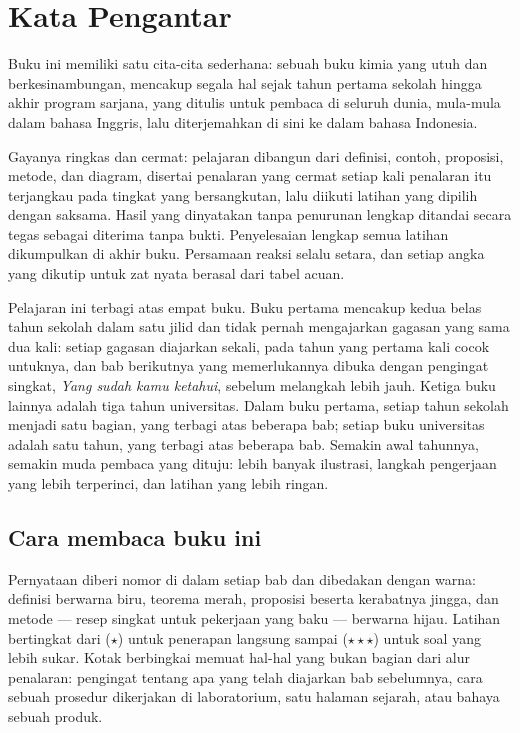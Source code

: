 \chapter{Kata Pengantar}

Buku ini memiliki satu cita-cita sederhana: sebuah buku kimia yang utuh
dan berkesinambungan, mencakup segala hal sejak tahun pertama sekolah
hingga akhir program sarjana, yang ditulis untuk pembaca di seluruh
dunia, mula-mula dalam bahasa Inggris, lalu diterjemahkan di sini ke
dalam bahasa Indonesia.

Gayanya ringkas dan cermat: pelajaran dibangun dari definisi, contoh,
proposisi, metode, dan diagram, disertai penalaran yang cermat setiap
kali penalaran itu terjangkau pada tingkat yang bersangkutan, lalu
diikuti latihan yang dipilih dengan saksama. Hasil yang dinyatakan tanpa
penurunan lengkap ditandai secara tegas sebagai diterima tanpa bukti.
Penyelesaian lengkap semua latihan dikumpulkan di akhir buku. Persamaan
reaksi selalu setara, dan setiap angka yang dikutip untuk zat nyata
berasal dari tabel acuan.

Pelajaran ini terbagi atas empat buku. Buku pertama mencakup kedua belas
tahun sekolah dalam satu jilid dan tidak pernah mengajarkan gagasan yang
sama dua kali: setiap gagasan diajarkan sekali, pada tahun yang pertama
kali cocok untuknya, dan bab berikutnya yang memerlukannya dibuka dengan
pengingat singkat, \emph{Yang sudah kamu ketahui}, sebelum melangkah
lebih jauh. Ketiga buku lainnya adalah tiga tahun universitas. Dalam
buku pertama, setiap tahun sekolah menjadi satu bagian, yang terbagi
atas beberapa bab; setiap buku universitas adalah satu tahun, yang
terbagi atas beberapa bab. Semakin awal tahunnya, semakin muda pembaca
yang dituju: lebih banyak ilustrasi, langkah pengerjaan yang lebih
terperinci, dan latihan yang lebih ringan.

\section*{Cara membaca buku ini}

Pernyataan diberi nomor di dalam setiap bab dan dibedakan dengan warna:
definisi berwarna biru, teorema merah, proposisi beserta kerabatnya
jingga, dan metode --- resep singkat untuk pekerjaan yang baku ---
berwarna hijau. Latihan bertingkat dari ($\star$) untuk penerapan
langsung sampai ($\star\star\star$) untuk soal yang lebih sukar. Kotak
berbingkai memuat hal-hal yang bukan bagian dari alur penalaran:
pengingat tentang apa yang telah diajarkan bab sebelumnya, cara sebuah
prosedur dikerjakan di laboratorium, satu halaman sejarah, atau bahaya
sebuah produk.

